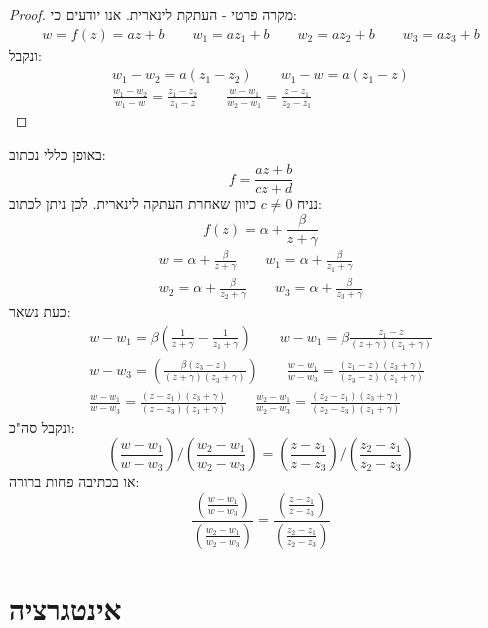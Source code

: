 \documentclass{tstextbook}
\begin{document}
\begin{proof}
מקרה פרטי - העתקת לינארית. אנו יודעים כי:
\begin{gather*}w = f(z)=az+b  \qquad w_{1}=az_{1}+b \qquad w_{2} = az_{2}+b \qquad w_{3}=az_{3}+b 
\end{gather*}
ונקבל:
\begin{gather*}w_{1}-w_{2} = a(z_{1}-z_{2}) \qquad w_{1}-w=a(z_{1}-z) \\\frac{w_{1}-w_{2}}{w_{1}-w}=\frac{z_{1}-z_{2}}{z_{1}-z} \qquad \frac{w-w_{1}}{w_{2}-w_{1}}=\frac{z-z_{1}}{z_{2}-z_{1}} 
\end{gather*}

\end{proof}
באופן כללי נכתוב:
$$f=\frac{az+b}{cz+d}$$
נניח \(c\neq 0\) כיוון שאחרת העתקה לינארית. לכן ניתן לכתוב:
$$f(z)=\alpha+\frac{\beta}{z+\gamma}$$\begin{gather*}w=\alpha+\frac{\beta}{z+\gamma} \qquad  w_{1}=\alpha+\frac{\beta}{z_{1}+\gamma}  \\w_{2}=\alpha+\frac{\beta}{z_{2}+\gamma} \qquad w_{3}=\alpha+\frac{\beta}{z_{3}+\gamma}
\end{gather*}
כעת נשאר:
\begin{gather*}w-w_{1}=\beta\left( \frac{1}{z+\gamma}-\frac{1}{z_{1}+\gamma} \right)  \qquad w-w_{1}=\beta \frac{z_{1}-z}{\left( z+\gamma \right)\left( z_{1}+\gamma \right)} \\w-w_{3} =\left( \frac{\beta (z_{3}-z)}{\left( z+\gamma \right)\left( z_{3}+\gamma \right)} \right) \qquad \frac{w-w_{1}}{w-w_{3}}=\frac{(z_{1}-z)\left( z_{3}+\gamma \right)}{(z_{3}-z)\left( z_{1}+\gamma \right)} \\\frac{w-w_{1}}{w-w_{3}} = \frac{(z-z_{1})\left( z_{3}+\gamma \right)}{(z-z_{3})\left( z_{1}+\gamma \right)} \qquad \frac{w_{2}-w_{1}}{w_{2}-w_{3}} = \frac{(z_{2}-z_{1})\left( z_{3}+\gamma \right)}{(z_{2}-z_{3})\left( z_{1}+\gamma \right)} 
\end{gather*}
ונקבל סה"כ:
$$\left( \frac{w-w_{1}}{w-w_{3}}  \right)/  \left( \frac{w_{2} - w_{1}}{w_{2}-w_{3}} \right) = \left( \frac{z - z_{1}}{z-z_{3}} \right) / \left( \frac{z_{2} - z_{1}}{z_{2}-z_{3}} \right)$$
או בכתיבה פחות ברורה:
$$\frac{\left( \frac{w-w_{1}}{w-w_{3}}  \right)}{\left( \frac{w_{2} - w_{1}}{w_{2}-w_{3}} \right)} = \frac{\left( \frac{z - z_{1}}{z-z_{3}} \right)}{\left( \frac{z_{2} - z_{1}}{z_{2}-z_{3}} \right)}$$

\chapter{אינטגרציה}
\end{document}
